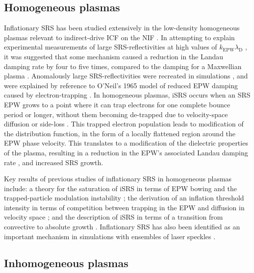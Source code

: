 \subsection{Homogeneous plasmas}
Inflationary SRS has been studied
extensively in the low-density homogeneous plasmas relevant to indirect-drive ICF on the NIF
\cite{Vu2002,Yin2006,Vu2007,Strozzi2007,Yin2008,Yin2012,Ellis2012}.
In attempting to explain experimental measurements of large SRS-reflectivities at high values of $k_\mathrm{EPW}\lambda_\mathrm{D}$
\cite{Fernandez2000,Montgomery2002}, it was suggested that some mechanism caused a reduction in the Landau damping
rate by four to five times, compared to the damping for a Maxwellian plasma \cite{Montgomery2002}.
Anomalously large SRS-reflectivities were recreated in simulations \cite{Vu2001,Vu2002}, and were explained by
reference to O'Neil's 1965 model of reduced EPW  damping caused by electron-trapping \cite{ONeil1965}.
In homogeneous plasmas, iSRS occurs when an SRS EPW grows to a point where it can trap electrons for one
complete bounce period or longer, without them becoming de-trapped due to velocity-space diffusion or
side-loss \cite{Vu2002}. This trapped electron population leads to modification of the distribution
function, in the form of a locally flattened region around the EPW phase velocity.
This translates to a modification of the dielectric properties of the plasma, resulting in a reduction in
the EPW's associated Landau damping rate \cite{ONeil1965,Vu2002}, and increased SRS growth.

 Key results of previous studies of inflationary SRS in homogeneous plasmas include: a theory for the saturation
 of iSRS in terms of EPW bowing and the trapped-particle modulation instability \cite{Yin2008}; the derivation
 of an inflation threshold intensity in terms of competition between trapping in the EPW and diffusion in
 velocity space \cite{Vu2007}; and the description of iSRS in terms of a transition from convective to absolute
 growth \cite{Wang2018}. Inflationary SRS has also been identified as an important mechanism in simulations  with ensembles of laser speckles \cite{Yin2012,Winjum2019}.

\subsection{Inhomogeneous plasmas}

